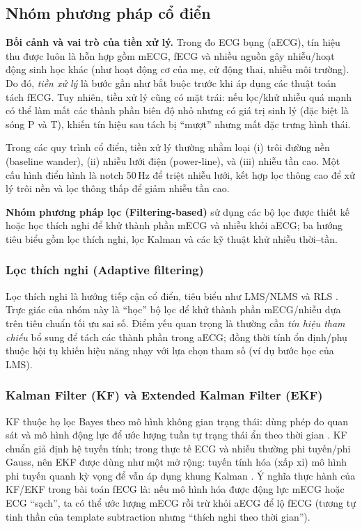 \documentclass[../DoAn.tex]{subfiles}
\begin{document}
\subsection{Nhóm phương pháp cổ điển}

\textbf{Bối cảnh và vai trò của tiền xử lý.}
Trong đo ECG bụng (aECG), tín hiệu thu được luôn là hỗn hợp gồm mECG, fECG và nhiều nguồn gây nhiễu/hoạt động sinh học khác (như hoạt động cơ của mẹ, cử động thai, nhiễu môi trường). Do đó, \textit{tiền xử lý} là bước gần như bắt buộc trước khi áp dụng các thuật toán tách fECG. Tuy nhiên, tiền xử lý cũng có mặt trái: nếu lọc/khử nhiễu quá mạnh có thể làm mất các thành phần biên độ nhỏ nhưng có giá trị sinh lý (đặc biệt là sóng P và T), khiến tín hiệu sau tách bị “mượt” nhưng mất đặc trưng hình thái.

Trong các quy trình cổ điển, tiền xử lý thường nhằm loại (i) trôi đường nền (baseline wander), (ii) nhiễu lưới điện (power-line), và (iii) nhiễu tần cao. Một cấu hình điển hình là notch 50\,Hz để triệt nhiễu lưới, kết hợp lọc thông cao để xử lý trôi nền và lọc thông thấp để giảm nhiễu tần cao.

\textbf{Nhóm phương pháp lọc (Filtering-based)} sử dụng các bộ lọc được thiết kế hoặc học thích nghi để khử thành phần mECG và nhiễu khỏi aECG; ba hướng tiêu biểu gồm lọc thích nghi, lọc Kalman và các kỹ thuật khử nhiễu thời--tần.

\subsubsection{Lọc thích nghi (Adaptive filtering)}
Lọc thích nghi là hướng tiếp cận cổ điển, tiêu biểu như LMS/NLMS và RLS \cite{fotiadouEnhancementLowqualityFetal2018}. Trực giác của nhóm này là “học” bộ lọc để khử thành phần mECG/nhiễu dựa trên tiêu chuẩn tối ưu sai số. Điểm yếu quan trọng là thường cần \textit{tín hiệu tham chiếu} bổ sung để tách các thành phần trong aECG; đồng thời tính ổn định/phụ thuộc hội tụ khiến hiệu năng nhạy với lựa chọn tham số (ví dụ bước học của LMS).

\subsubsection{Kalman Filter (KF) và Extended Kalman Filter (EKF)}
KF thuộc họ lọc Bayes theo mô hình không gian trạng thái: dùng phép đo quan sát và mô hình động lực để ước lượng tuần tự trạng thái ẩn theo thời gian \cite{suganthyEnhancementSNRFetal2019}. KF chuẩn giả định hệ tuyến tính; trong thực tế ECG và nhiễu thường phi tuyến/phi Gauss, nên EKF được dùng như một mở rộng: tuyến tính hóa (xấp xỉ) mô hình phi tuyến quanh kỳ vọng để vẫn áp dụng khung Kalman \cite{sarafanNovelECGDenoising2022}. Ý nghĩa thực hành của KF/EKF trong bài toán fECG là: nếu mô hình hóa được động lực mECG hoặc ECG “sạch”, ta có thể ước lượng mECG rồi trừ khỏi aECG để lộ fECG (tương tự tinh thần của template subtraction nhưng “thích nghi theo thời gian”).
\end{document}
